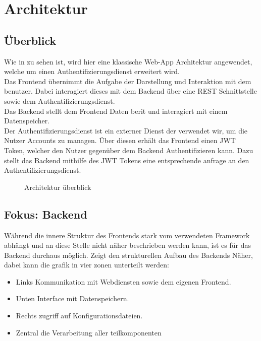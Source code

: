 \chapter{Architektur}\label{ch:architektur}

\section{Überblick}\label{sec:uberblick}
Wie in  zu sehen ist, wird hier eine klassische Web-App Architektur angewendet,
welche um einen Authentifizierungsdienst erweitert wird.\\
Das Frontend übernimmt die Aufgabe der Darstellung und Interaktion mit dem benutzer.
Dabei interagiert dieses mit dem Backend über eine \ac{REST} Schnittstelle sowie dem Authentifizierungsdienst.\\
Das Backend stellt dem Frontend Daten berit und interagiert mit einem Datenspeicher.\\
Der Authentifizierungsdienst ist ein externer Dienst der verwendet wir, um die Nutzer Accounts zu managen.
Über diesen erhält das Frontend einen \ac{JWT} Token, welcher den Nutzer gegenüber dem Backend Authentifizieren kann.
Dazu stellt das Backend mithilfe des \ac{JWT} Tokens eine entsprechende anfrage an den Authentifizierungsdienst.

\begin{figure}[h]
    \centering
    
    \caption{Architektur überblick}\label{fig:HighLevelArch}
\end{figure}

\section{Fokus: Backend}\label{sec:fokus:-backend}

Während die innere Struktur des Frontends stark vom verwendeten Framework abhängt und an diese Stelle nicht näher beschrieben werden kann,
ist es für das Backend durchaus möglich.
 Zeigt den strukturellen Aufbau des Backends Näher, dabei kann die grafik in vier zonen unterteilt werden:
\begin{itemize}
    \item Links Kommunikation mit Webdiensten sowie dem eigenen Frontend.
    \item Unten Interface mit Datenspeichern.
    \item Rechts zugriff auf Konfigurationsdateien.
    \item Zentral die Verarbeitung aller teilkomponenten
\end{itemize}

